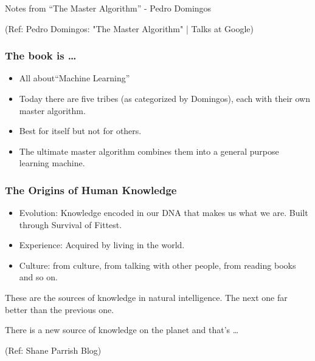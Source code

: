 \begin{frame}[fragile]\frametitle{}

\begin{center}
{\Large Notes from ``The Master Algorithm'' - Pedro Domingos}

  {\tiny (Ref: Pedro Domingos: "The Master Algorithm" | Talks at Google)}

\end{center}


\end{frame}

\begin{frame}[fragile]\frametitle{The book is \ldots}
  \begin{itemize}
    \item All about``Machine Learning''
	\item Today there are five tribes (as categorized by Domingos), each with their own master algorithm. 
	\item Best for itself but not for others.
	\item The ultimate master algorithm combines them into a general purpose learning machine.
  \end{itemize}
\end{frame}

\begin{frame}[fragile]\frametitle{The Origins of Human Knowledge}
  \begin{itemize}
    \item Evolution:  Knowledge encoded in our DNA that makes us what we are. Built through Survival of Fittest.
	\item Experience: Acquired by living in the world.
	\item Culture: from culture, from talking with other people, from reading books and so on.
	\end{itemize}

	These are the sources of knowledge in natural intelligence. The next one far better than the previous one.
	
	There is a new source of knowledge on the planet and that’s \ldots
	
	
  {\tiny (Ref: Shane Parrish Blog)}
  
\end{frame}

